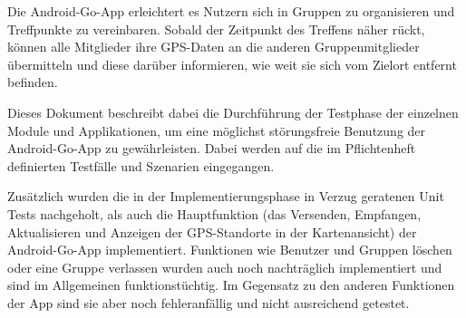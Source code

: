 Die Android-Go-App erleichtert es Nutzern sich in Gruppen zu organisieren und Treffpunkte zu vereinbaren. Sobald der Zeitpunkt des Treffens näher rückt, können alle Mitglieder ihre GPS-Daten an die anderen Gruppenmitglieder übermitteln und diese darüber informieren, wie weit sie sich vom Zielort entfernt befinden.

Dieses Dokument beschreibt dabei die Durchführung der Testphase der einzelnen Module und Applikationen, um eine möglichst störungsfreie Benutzung der Android-Go-App zu gewährleisten. Dabei werden auf die im Pflichtenheft definierten Testfälle und Szenarien eingegangen.

Zusätzlich wurden die in der Implementierungsphase in Verzug geratenen Unit Tests nachgeholt, als auch die Hauptfunktion (das Versenden, Empfangen, Aktualisieren und Anzeigen der GPS-Standorte in der Kartenansicht) der Android-Go-App implementiert. 
Funktionen wie Benutzer und Gruppen löschen oder eine Gruppe verlassen wurden auch noch nachträglich implementiert und sind im Allgemeinen funktionstüchtig. Im Gegensatz zu den anderen Funktionen der App sind sie aber noch fehleranfällig und nicht ausreichend getestet.
